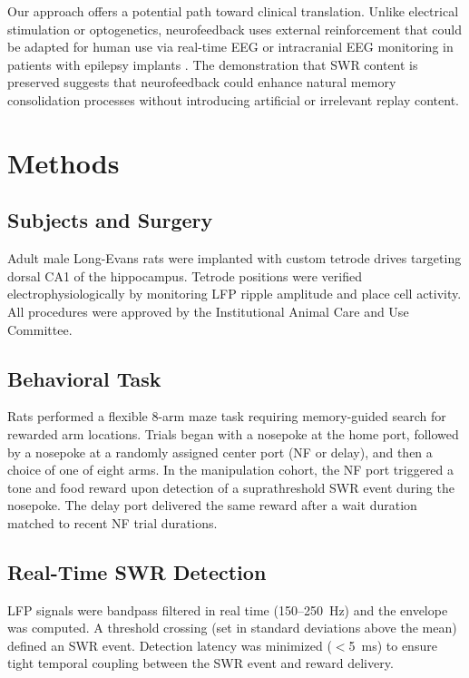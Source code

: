 \documentclass[11pt]{article}
\begin{document}
Our approach offers a potential path toward clinical translation. Unlike electrical stimulation or optogenetics, neurofeedback uses external reinforcement that could be adapted for human use via real-time EEG or intracranial EEG monitoring in patients with epilepsy implants \citep{sitaram2017}. The demonstration that SWR content is preserved suggests that neurofeedback could enhance natural memory consolidation processes without introducing artificial or irrelevant replay content.

\section{Methods}

\subsection{Subjects and Surgery}

Adult male Long-Evans rats were implanted with custom tetrode drives targeting dorsal CA1 of the hippocampus. Tetrode positions were verified electrophysiologically by monitoring LFP ripple amplitude and place cell activity. All procedures were approved by the Institutional Animal Care and Use Committee.

\subsection{Behavioral Task}

Rats performed a flexible 8-arm maze task requiring memory-guided search for rewarded arm locations. Trials began with a nosepoke at the home port, followed by a nosepoke at a randomly assigned center port (NF or delay), and then a choice of one of eight arms. In the manipulation cohort, the NF port triggered a tone and food reward upon detection of a suprathreshold SWR event during the nosepoke. The delay port delivered the same reward after a wait duration matched to recent NF trial durations.

\subsection{Real-Time SWR Detection}

LFP signals were bandpass filtered in real time (150--250~Hz) and the envelope was computed. A threshold crossing (set in standard deviations above the mean) defined an SWR event. Detection latency was minimized ($<$5~ms) to ensure tight temporal coupling between the SWR event and reward delivery.
\end{document}
